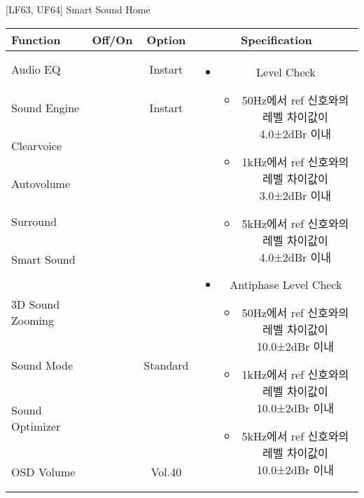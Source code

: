 \begin{frame}[t]{[LF63, UF64] Smart Sound Home}
\begin{tiny}
\begin{tabular}{@{}lccc@{}}
\toprule
Function & Off/On & Option & Specification \\
\midrule
Audio EQ & \color{black}{Off} & Instart &
\multirow{10}{60mm}{
\begin{itemize}
\item Level Check
  \begin{itemize}
  \item 50Hz에서 ref 신호와의 레벨 차이값이 4.0±2dBr 이내
  \item 1kHz에서 ref 신호와의 레벨 차이값이 3.0±2dBr 이내
  \item 5kHz에서 ref 신호와의 레벨 차이값이 4.0±2dBr 이내
  \end{itemize}
\item Antiphase Level Check
  \begin{itemize}
  \item 50Hz에서 ref 신호와의 레벨 차이값이 10.0±2dBr 이내
  \item 1kHz에서 ref 신호와의 레벨 차이값이 10.0±2dBr 이내
  \item 5kHz에서 ref 신호와의 레벨 차이값이 10.0±2dBr 이내
  \end{itemize}
\end{itemize}
} \\
Sound Engine & \color{blue}{On} & Instart & \\
Clearvoice & \color{black}{Off} & & \\
Autovolume & \color{black}{Off} & & \\
Surround & \color{black}{Off} & & \\
Smart Sound & \color{blue}{On} & & \\
3D Sound Zooming & \color{black}{Off} & & \\
Sound Mode & \color{blue}{On} & Standard & \\
Sound Optimizer & \color{black}{Off} & & \\
OSD Volume & \color{blue}{On} & Vol.40 & \\
\midrule
\end{tabular}
\end{tiny}

\end{frame}
